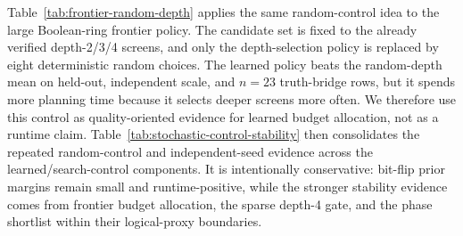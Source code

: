 \documentclass[11pt]{article}
\begin{document}
\begin{table}[H]
\centering
\scriptsize
\setlength{\tabcolsep}{3pt}
\renewcommand{\arraystretch}{1.06}
\caption{Random-interval control for the cross-validated ANF-term feature
gate.  Random controls keep the same fold-wise widths as the learned-support
gate but choose interval positions independently over the observed ANF-term
range.}
\label{tab:bitflip-prior-feature-gate-random-control}

\end{table}

Table~\ref{tab:frontier-random-depth} applies the same random-control idea to
the large Boolean-ring frontier policy.  The candidate set is fixed to the
already verified depth-2/3/4 screens, and only the depth-selection policy is
replaced by eight deterministic random choices.  The learned policy beats the
random-depth mean on held-out, independent scale, and $n=23$ truth-bridge rows,
but it spends more planning time because it selects deeper screens more often.
We therefore use this control as quality-oriented evidence for learned budget
allocation, not as a runtime claim.
Table~\ref{tab:stochastic-control-stability} then consolidates the repeated
random-control and independent-seed evidence across the learned/search-control
components.  It is intentionally conservative: bit-flip prior margins remain
small and runtime-positive, while the stronger stability evidence comes from
frontier budget allocation, the sparse depth-4 gate, and the phase shortlist
within their logical-proxy boundaries.

\begin{table}[H]
\centering
\scriptsize
\setlength{\tabcolsep}{3pt}
\renewcommand{\arraystretch}{1.08}
\caption{Same-candidate random-depth control for the Boolean-ring frontier
policy.  W/L/T compares the learned large frontier policy with the
per-function mean over eight deterministic random depth choices among the
already verified depth-2/3/4 candidates.}
\label{tab:frontier-random-depth}

\end{table}

\begin{table}[H]
\centering
\scriptsize
\setlength{\tabcolsep}{2pt}
\renewcommand{\arraystretch}{1.06}
\caption{Stochastic learned-control stability summary.  Rows consolidate
same-budget random-prior, same-candidate random-depth, random shortlist, and
independent-seed sparse-gate checks.  Negative score changes favor the learned
or guarded controller.}
\label{tab:stochastic-control-stability}

\end{table}
\end{document}
